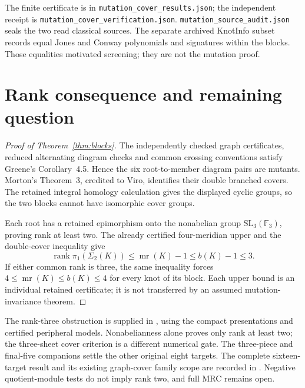 \documentclass[11pt]{article}
\newcommand{\rank}{\operatorname{rank}}
\newcommand{\mr}{\operatorname{mr}}
\begin{document}
The finite certificate is in \texttt{mutation\_cover\_results.json};
the independent receipt is \texttt{mutation\_cover\_verification.json}.
\texttt{mutation\_source\_audit.json} seals the two read classical
sources. The separate archived KnotInfo subset records equal Jones
and Conway polynomials and signatures within the blocks. Those
equalities motivated screening; they are not the mutation proof.

\section{Rank consequence and remaining question}

\begin{proof}[Proof of Theorem~\ref{thm:blocks}]
The independently checked graph certificates, reduced alternating
diagram checks and common crossing conventions satisfy Greene's
Corollary~4.5. Hence the six root-to-member diagram pairs are mutants.
Morton's Theorem~3, credited to Viro, identifies their double branched
covers. The retained integral homology calculation gives the displayed
cyclic groups, so the two blocks cannot have isomorphic cover groups.

Each root has a retained epimorphism onto the nonabelian group
$\mathrm{SL}_3(\mathbb F_3)$, proving rank at least two. The already
certified four-meridian upper and the double-cover inequality give
\[
 \rank\pi_1(\Sigma_2(K))\le\mr(K)-1\le b(K)-1\le3.
\]
If either common rank is three, the same inequality forces
$4\le\mr(K)\le b(K)\le4$ for every knot of its block.
Each upper bound is an individual retained certificate; it is not
transferred by an assumed mutation-invariance theorem.
\end{proof}

The rank-three obstruction is supplied in
, using the compact
presentations and certified peripheral models. Nonabelianness alone
proves only rank at least two; the three-sheet cover criterion is a
different numerical gate. The three-piece and final-five companions
settle the other original eight targets. The complete sixteen-target
result and its existing graph-cover family scope are recorded in
. Negative
quotient-module tests do not imply rank two, and full MRC remains open.
\end{document}
